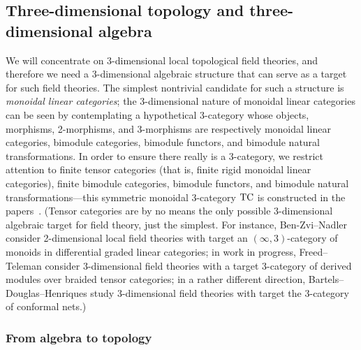 \documentclass{amsart}
\begin{document}
\subsection{Three-dimensional topology and three-dimensional algebra}

We will concentrate on 3-dimensional local topological field theories, and therefore we need a 3-dimensional algebraic structure that can serve as a target for such field theories.  The simplest nontrivial candidate for such a structure is \emph{monoidal linear categories}; the 3-dimensional nature of monoidal linear categories can be seen by contemplating a hypothetical 3-category whose objects, morphisms, 2-morphisms, and 3-morphisms are respectively monoidal linear categories, bimodule categories, bimodule functors, and bimodule natural transformations.  In order to ensure there really is a 3-category, we restrict attention to finite tensor categories (that is, finite rigid monoidal linear categories), finite bimodule categories, bimodule functors, and bimodule natural transformations---this symmetric monoidal 3-category $\mathrm{TC}$ is constructed in the papers~\cite{BTP,3TC}.  (Tensor categories are by no means the only possible 3-dimensional algebraic target for field theory, just the simplest.  For instance, Ben-Zvi--Nadler~\cite{0904.1247} consider 2-dimensional local field theories with target an $(\infty,3)$-category of monoids in differential graded linear categories; in work in progress, Freed--Teleman consider 3-dimensional field theories with a target 3-category of derived modules over braided tensor categories; in a rather different direction, Bartels--Douglas--Henriques study 3-dimensional field theories with target the 3-category of conformal nets.) 


\subsubsection{From algebra to topology}
\end{document}
